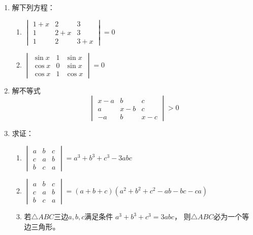 \begin{enumerate}
\item 解下列方程：
\begin{multicols}{2}
\begin{enumerate}
    \item $\begin{vmatrix}
        1+x&2&3\\1&2+x&3\\1&2&3+x
    \end{vmatrix}=0$
    \item $\begin{vmatrix}
        \sin x&1&\sin x\\ \cos x&0&\sin x\\ \cos x&1&\cos x
    \end{vmatrix}=0$
\end{enumerate}
\end{multicols}

\item 解不等式
\[\begin{vmatrix}
    x-a&b&c\\a&x-b&c\\-a&b&x-c
\end{vmatrix}>0\]

\item 求证：
\begin{enumerate}
    \item $\begin{vmatrix}
        a&b&c\\c&a&b\\b&c&a
    \end{vmatrix}=a^3+b^3+c^3-3abc$
    \item $\begin{vmatrix}
        a&b&c\\c&a&b\\b&c&a
    \end{vmatrix}=(a+b+c)(a^2+b^2+c^2-ab-bc-ca)$
    \item 若$\triangle ABC$三边$a,b,c$满足条件
    $a^3+b^3+c^3=3abc$，
    则$\triangle ABC$必为一个等边三角形。
\end{enumerate}


\end{enumerate}
